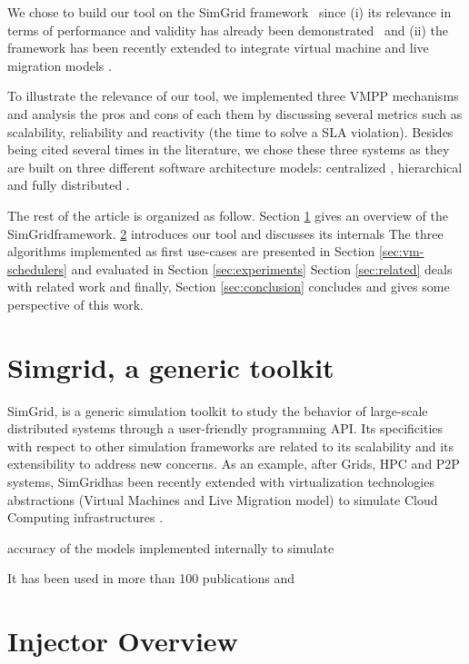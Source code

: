 \documentclass[conference]{IEEEtran}
\newcommand{\sg}{SimGrid}
\begin{document}
%
We chose to build our tool on the \sg
framework~\cite{casanova:hal-01017319} since (i) its relevance in
terms of performance and validity has already been
demonstrated~\cite{simgridpub} and (ii) the framework has been
recently extended to integrate virtual machine and live migration
models \cite{Hirofuchi:2013:ALM:2568486.2568524}.

To illustrate the relevance of our tool, we implemented three VMPP
mechanisms \cite{Hermenier:2009:ECM:1508293.1508300}
\cite{feller:ccgrid12} \cite{quesnel:cpe2012} and analysis the pros
and cons of each them by discussing several metrics such as
scalability, reliability and reactivity (\ie the time to solve a SLA
violation). Besides being cited several times in the literature, we
chose these three systems as they are built on three different
software architecture models: centralized
\cite{Hermenier:2009:ECM:1508293.1508300}, hierarchical
\cite{feller:ccgrid12} and fully distributed \cite{quesnel:cpe2012}.


The rest of the article is organized as follow. Section \ref{sec:sg}
gives an overview of the \sg framework.
\ref{sec:injector} introduces our tool and discusses its internals
The three algorithms implemented as first use-cases are presented in
Section \ref{sec:vm-schedulers} and evaluated in Section \ref{sec:experiments}
Section \ref{sec:related} deals with related work and
finally, Section \ref{sec:conclusion} concludes and gives some perspective of this
work.


\section{Simgrid, a generic toolkit}
\label{sec:sg}

\sg, is a  generic simulation toolkit to study the behavior of
large-scale distributed systems through a user-friendly programming
API.  Its specificities with respect to other simulation frameworks are
related to its scalability and its extensibility to address new
concerns. As an example, after Grids, HPC and P2P systems, \sg has
been recently extended with virtualization technologies abstractions
(\ie Virtual Machines and Live Migration model) to simulate Cloud
Computing infrastructures .

accuracy of the models implemented
internally to simulate

 It has been used in more than 100 publications
and



\section{Injector Overview}
\label{sec:injector}
\end{document}
